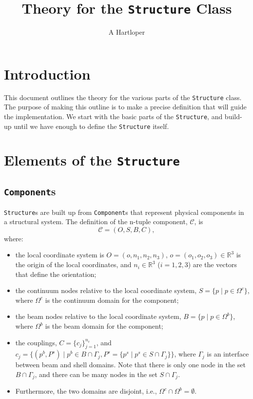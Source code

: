 \documentclass[a4paper]{article}
\title{Theory for the \texttt{Structure} Class}
\author{A Hartloper}
\newcommand{\structureClass}{\texttt{Structure}}
\newcommand{\componentClass}{\texttt{Component}}
\begin{document}
\maketitle

\section{Introduction}

This document outlines the theory for the various parts of the \structureClass{} class.
The purpose of making this outline is to make a precise definition that will guide the implementation.
We start with the basic parts of the \structureClass{}, and build-up until we have enough to define the \structureClass{} itself.

\section{Elements of the \structureClass{}}

\subsection{\componentClass{}s}

\structureClass{}s are built up from \componentClass{}s that represent physical components in a structural system.
The definition of the n-tuple component, $\mathcal{C}$, is 
\begin{equation}
    \mathcal{C} = (O, S, B, C),
\end{equation}
where:
\begin{itemize}
    \item the local coordinate system is $O = (o, n_1, n_2, n_3)$, $o = (o_1, o_2, o_3) \in \mathbb{R}^3$ is the origin of the local coordinates, and $n_i \in \mathbb{R}^3$ ($i = 1, 2, 3$) are the vectors that define the orientation;
    \item the continuum nodes relative to the local coordinate system, $S = \{p \mid p \in \Omega^c\}$, where $\Omega^c$ is the continuum domain for the component;
    \item the beam nodes relative to the local coordinate system, $B = \{p \mid p \in \Omega^b\}$, where $\Omega^b$ is the beam domain for the component;
    \item the couplings, $C = \{c_j\}_{j=1}^{n_c}$, and $c_j = \{(p^b, P^s) \mid p^b \in B \cap \Gamma_j, P^s = \{ p^s \mid p^s \in S \cap \Gamma_j \}  \}$, where $\Gamma_j$ is an interface between beam and shell domains. Note that there is only one node in the set $B \cap \Gamma_j$, and there can be many nodes in the set $S \cap \Gamma_j$.
    \item Furthermore, the two domains are disjoint, i.e., $\Omega^c \cap \Omega^b = \emptyset$.
\end{itemize}
\end{document}
